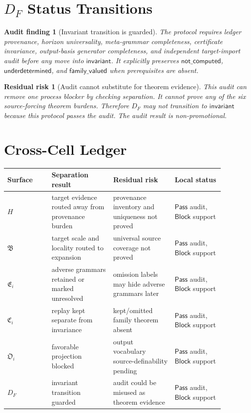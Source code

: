 \documentclass[11pt]{article}
\newcommand{\HorizonFam}{\mathfrak{B}}
\newcommand{\EnumFam}{\mathfrak{E}}
\newcommand{\CertFam}{\mathfrak{C}}
\newcommand{\OutFam}{\mathfrak{O}}
\newcommand{\Pass}{\mathsf{Pass}}
\newcommand{\Block}{\mathsf{Block}}
\newtheorem{auditfinding}{Audit finding}
\newtheorem{residualrisk}{Residual risk}
\begin{document}
\section{\texorpdfstring{\(D_F\)}{DF} Status Transitions}

\begin{auditfinding}[Invariant transition is guarded]
The protocol requires ledger provenance, horizon universality, meta-grammar
completeness, certificate invariance, output-basis generator completeness,
and independent target-import audit before any move into
\(\mathsf{invariant}\). It explicitly preserves \(\mathsf{not\_computed}\),
\(\mathsf{underdetermined}\), and \(\mathsf{family\_valued}\) when
prerequisites are absent.
\end{auditfinding}

\begin{residualrisk}[Audit cannot substitute for theorem evidence]
This audit can remove one process blocker by checking separation. It cannot
prove any of the six source-forcing theorem burdens. Therefore \(D_F\) may
not transition to \(\mathsf{invariant}\) because this protocol passes the
audit. The audit result is non-promotional.
\end{residualrisk}

\section{Cross-Cell Ledger}

\begin{center}
\begin{tabular}{p{0.18\linewidth}p{0.25\linewidth}p{0.25\linewidth}p{0.2\linewidth}}
\textbf{Surface} & \textbf{Separation result} & \textbf{Residual risk} & \textbf{Local status} \\
\hline
\(H\) & target evidence routed away from provenance burden & provenance inventory and uniqueness not proved & \(\Pass\) audit, \(\Block\) support \\
\(\HorizonFam\) & target scale and locality routed to expansion & universal source coverage not proved & \(\Pass\) audit, \(\Block\) support \\
\(\EnumFam_i\) & adverse grammars retained or marked unresolved & omission labels may hide adverse grammars later & \(\Pass\) audit, \(\Block\) support \\
\(\CertFam_i\) & replay kept separate from invariance & kept/omitted family theorem absent & \(\Pass\) audit, \(\Block\) support \\
\(\OutFam_i\) & favorable projection blocked & output vocabulary source-definability pending & \(\Pass\) audit, \(\Block\) support \\
\(D_F\) & invariant transition guarded & audit could be misused as theorem evidence & \(\Pass\) audit, \(\Block\) support \\
\end{tabular}
\end{center}
\end{document}
